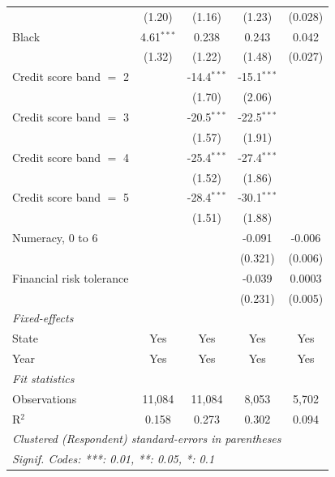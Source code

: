 \begin{tabular}{lcccc}
                                  & (1.20)         & (1.16)         & (1.23)         & (0.028)\\   
   Black                          & 4.61$^{***}$   & 0.238          & 0.243          & 0.042\\   
                                  & (1.32)         & (1.22)         & (1.48)         & (0.027)\\   
   Credit score band $=$ 2        &                & -14.4$^{***}$  & -15.1$^{***}$  &   \\   
                                  &                & (1.70)         & (2.06)         &   \\   
   Credit score band $=$ 3        &                & -20.5$^{***}$  & -22.5$^{***}$  &   \\   
                                  &                & (1.57)         & (1.91)         &   \\   
   Credit score band $=$ 4        &                & -25.4$^{***}$  & -27.4$^{***}$  &   \\   
                                  &                & (1.52)         & (1.86)         &   \\   
   Credit score band $=$ 5        &                & -28.4$^{***}$  & -30.1$^{***}$  &   \\   
                                  &                & (1.51)         & (1.88)         &   \\   
   Numeracy, 0 to 6               &                &                & -0.091         & -0.006\\   
                                  &                &                & (0.321)        & (0.006)\\   
   Financial risk tolerance       &                &                & -0.039         & 0.0003\\   
                                  &                &                & (0.231)        & (0.005)\\   
   \midrule
   \emph{Fixed-effects}\\
   State                          & Yes            & Yes            & Yes            & Yes\\  
   Year                           & Yes            & Yes            & Yes            & Yes\\  
   \midrule
   \emph{Fit statistics}\\
   Observations                   & 11,084         & 11,084         & 8,053          & 5,702\\  
   R$^2$                          & 0.158          & 0.273          & 0.302          & 0.094\\  
   \midrule \midrule
   \multicolumn{5}{l}{\emph{Clustered (Respondent) standard-errors in parentheses}}\\
   \multicolumn{5}{l}{\emph{Signif. Codes: ***: 0.01, **: 0.05, *: 0.1}}\\
\end{tabular}
\par\endgroup


